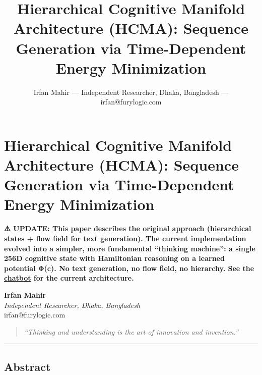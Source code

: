 \documentclass[
  11pt,
  a4paper,
]{article}
\title{Hierarchical Cognitive Manifold Architecture (HCMA): Sequence
Generation via Time-Dependent Energy Minimization}
\author{Irfan Mahir --- Independent Researcher, Dhaka, Bangladesh ---
irfan@furylogic.com}
\date{}
\begin{document}
\maketitle

{
\hypersetup{linkcolor=}
\setcounter{tocdepth}{3}
\tableofcontents
}
\section{Hierarchical Cognitive Manifold Architecture (HCMA): Sequence
Generation via Time-Dependent Energy
Minimization}\label{hierarchical-cognitive-manifold-architecture-hcma-sequence-generation-via-time-dependent-energy-minimization}

\textbf{⚠️ UPDATE: This paper describes the original approach
(hierarchical states + flow field for text generation). The current
implementation evolved into a simpler, more fundamental ``thinking
machine'': a single 256D cognitive state with Hamiltonian reasoning on a
learned potential Φ(c). No text generation, no flow field, no hierarchy.
See the \href{../src/chatbot.cpp}{chatbot} for the current
architecture.}

\textbf{Irfan Mahir}\\
\emph{Independent Researcher, Dhaka, Bangladesh}\\
irfan@furylogic.com

\begin{quote}
\emph{``Thinking and understanding is the art of innovation and
invention.''}
\end{quote}

\begin{center}\rule{0.5\linewidth}{0.5pt}\end{center}

\subsection{Abstract}\label{abstract}
\end{document}
